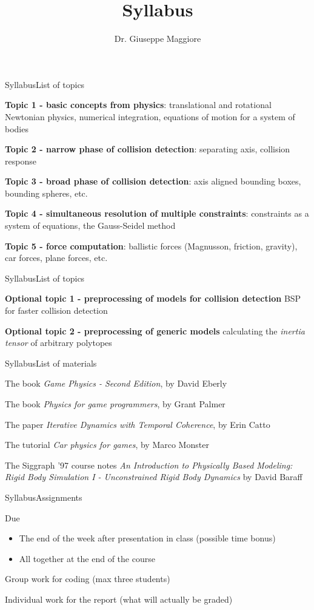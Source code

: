 \documentclass{beamer}
\title{Syllabus}
\author{Dr. Giuseppe Maggiore}
\institute{NHTV University of Applied Sciences \\ 
Breda, Netherlands}
\date{}
\begin{document}
\maketitle

\begin{slide}{Syllabus}{List of topics}{
\item \textbf{Topic 1 - basic concepts from physics}: translational and rotational Newtonian physics, numerical integration, equations of motion for a system of bodies
\item \textbf{Topic 2 - narrow phase of collision detection}: separating axis, collision response
\item \textbf{Topic 3 - broad phase of collision detection}: axis aligned bounding boxes, bounding spheres, etc.
\item \textbf{Topic 4 - simultaneous resolution of multiple constraints}: constraints as a system of equations, the Gauss-Seidel method
\item \textbf{Topic 5 - force computation}: ballistic forces (Magnusson, friction, gravity), car forces, plane forces, etc. 
}\end{slide}

\begin{slide}{Syllabus}{List of topics}{
\item \textbf{Optional topic 1 - preprocessing of models for collision detection} BSP for faster collision detection
\item \textbf{Optional topic 2 - preprocessing of generic models} calculating the \textit{inertia tensor} of arbitrary polytopes
}\end{slide}

\begin{slide}{Syllabus}{List of materials}{
\item The book \textit{Game Physics - Second Edition}, by David Eberly
\item The book \textit{Physics for game programmers}, by Grant Palmer
\item The paper \textit{Iterative Dynamics with Temporal Coherence}, by Erin Catto 
\item The tutorial \textit{Car physics for games}, by Marco Monster
\item The Siggraph '97 course notes \textit{An Introduction to Physically Based Modeling: Rigid Body Simulation I - Unconstrained Rigid Body Dynamics} by David Baraff 
}\end{slide}

\begin{slide}{Syllabus}{Assignments}{
\item Due
\begin{itemize}
\item The end of the week after presentation in class (possible time bonus)
\item All together at the end of the course
\end{itemize}
\item Group work for coding (max three students)
\item Individual work for the report (what will actually be graded)
}\end{slide}
\end{document}
